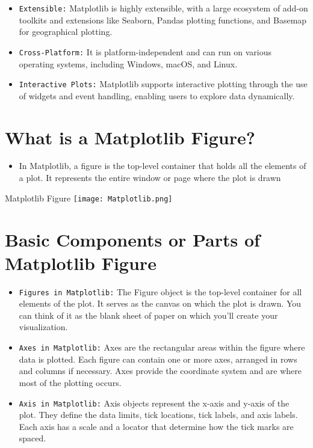 \documentclass[serif, aspectratio=169]{beamer}
\begin{document}
\begin{frame}
    \begin{itemize}
        \item \texttt{\color{red}Extensible:} Matplotlib is highly extensible, with a large ecosystem of add-on toolkits and extensions like Seaborn, Pandas plotting functions, and Basemap for geographical plotting.
        \item \texttt{\color{red}Cross-Platform:} It is platform-independent and can run on various operating systems, including Windows, macOS, and Linux.
       \item \texttt{\color{red}Interactive Plots:} Matplotlib supports interactive plotting through the use of widgets and event handling, enabling users to explore data dynamically.
    \end{itemize}
\end{frame}

\section{What is a Matplotlib Figure?}
\begin{frame}
    \begin{itemize}
       \item In Matplotlib, a figure is the top-level container that holds all the elements of a plot. It represents the entire window or page where the plot is drawn
    \end{itemize}
\end{frame}

\begin{frame}{Matplotlib Figure}
    \centering
    \texttt{[image: Matplotlib.png]}
\end{frame}

\section{Basic Components or Parts of Matplotlib Figure}

\begin{frame}
    \begin{itemize}
        \item \texttt{\color{red}Figures in Matplotlib:} The Figure object is the top-level container for all elements of the plot. It serves as the canvas on which the plot is drawn. You can think of it as the blank sheet of paper on which you’ll create your visualization.
        \item \texttt{\color{red}Axes in Matplotlib:} Axes are the rectangular areas within the figure where data is plotted. Each figure can contain one or more axes, arranged in rows and columns if necessary. Axes provide the coordinate system and are where most of the plotting occurs.
        \item \texttt{\color{red}Axis in Matplotlib:} Axis objects represent the x-axis and y-axis of the plot. They define the data limits, tick locations, tick labels, and axis labels. Each axis has a scale and a locator that determine how the tick marks are spaced.
    \end{itemize}
\end{frame}
\end{document}
